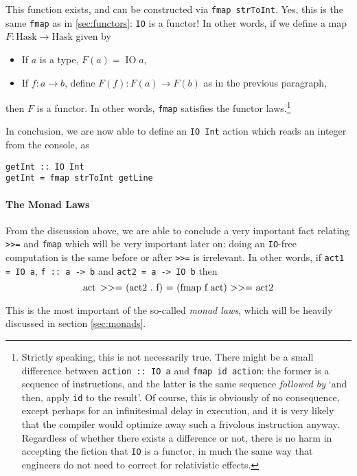 \documentclass[11	pt]{article}
\theoremstyle{nonumberplain}
\newcommand{\Hask}{\mathrm{Hask}}
\newcommand{\typecons}[1]{\mathop{\mathrm{#1}}}
\newcommand*\lsin{\lstinline}
\newcommand*\lsmath[1]{\text{\lstinline|#1|}}
\begin{document}
This function exists, and can be constructed via \lsin|fmap strToInt|. Yes, this is the same \lsin|fmap| as in \ref{sec:functors}: \lsin|IO| is a functor! In other words, if we define a map $F \colon \Hask \to \Hask$ given by
\begin{itemize}
\item If $a$ is a type, $F(a) = \typecons{IO} a$,
\item If $f \colon a \to b$, define $F(f) \colon F(a) \to F(b)$ as in the previous paragraph,
\end{itemize}
then $F$ is a functor. In other words, \lsin|fmap| satisfies the functor laws.\footnote{Strictly speaking, this is not necessarily true. There might be a small difference between \lsin|action :: IO a| and \lsin|fmap id action|: the former is a sequence of instructions, and the latter is the same sequence \emph{followed by} `and then, apply \lsin|id| to the result'. Of course, this is obviously of no consequence, except perhaps for an infinitesimal delay in execution, and it is very likely that the compiler would optimize away such a frivolous instruction anyway. Regardless of whether there exists a difference or not, there is no harm in accepting the fiction that \lsin|IO| is a functor, in much the same way that engineers do not need to correct for relativistic effects.}

In conclusion, we are now able to define an \lsin|IO Int| action which reads an integer from the console, as
\begin{lstlisting}
getInt :: IO Int
getInt = fmap strToInt getLine
\end{lstlisting}

\paragraph{The Monad Laws}

From the discussion above, we are able to conclude a very important fact relating \lsin|>>=| and \lsin|fmap| which will be very important later on: doing an \lsin|IO|-free computation is the same before or after \lsin|>>=| is irrelevant. In other words, if \lsin|act1 = IO a|, \lsin|f :: a -> b| and \lsin|act2 = a -> IO b| then
\begin{equation}
\lsmath{act >>= (act2 . f) = (fmap f act) >>= act2}
\end{equation}

This is the most important of the so-called \emph{monad laws}, which will be heavily discussed in section \ref{sec:monads}.
\end{document}
